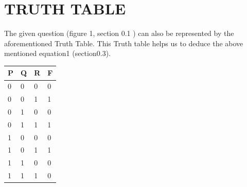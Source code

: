\documentclass{report}
\begin{document}
\newpage
\section{TRUTH TABLE}

The given question (figure 1, section 0.1 ) can also be represented by the aforementioned Truth Table. This Truth table helps us to deduce the above mentioned equation1 (section0.3).
\begin{table}[]\centering
    \begin{tabular}{|l|l|l|l|}
         \hline
        P & Q & R & F  \\ \hline
        0 & 0 & 0     & 0        \\
        0 & 0 & 1     & 1       \\
        0 & 1 & 0     & 0        \\ 
        0 & 1 & 1     & 1        \\
        1 & 0 & 0     & 0         \\
        1 & 0 & 1     & 1         \\
        1 & 1 & 0     & 0         \\
        1 & 1 & 1     & 0         \\ \hline

\end{tabular}
\end{table}
\end{document}
